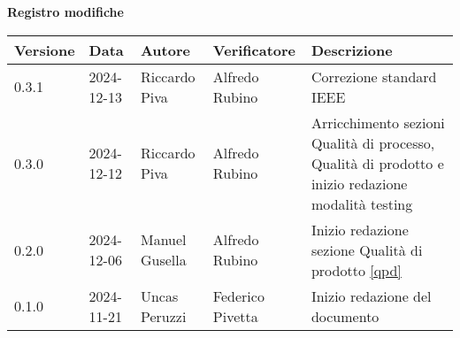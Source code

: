 \documentclass[11pt]{article}
\begin{document}
\begin{center}
\textbf{Registro modifiche}\\
\vspace{2mm}
\begin{tabularx}{\textwidth}{|l|l|l|l|X|}
\hline
\textbf{Versione} & \textbf{Data} & \textbf{Autore} & \textbf{Verificatore} & \textbf{Descrizione} \\
\hline
0.3.1 & 2024-12-13 & Riccardo Piva & Alfredo Rubino & Correzione standard IEEE \\
\hline
0.3.0 & 2024-12-12 & Riccardo Piva & Alfredo Rubino & Arricchimento sezioni Qualità di processo, Qualità di prodotto e inizio redazione modalità testing \\
\hline
0.2.0 & 2024-12-06 & Manuel Gusella  & Alfredo Rubino & Inizio redazione sezione Qualità di prodotto \ref{qpd}\\
\hline
0.1.0 & 2024-11-21 & Uncas Peruzzi  & Federico Pivetta & Inizio redazione del documento\\
\hline
\end{tabularx}
\end{center}
\newpage
\tableofcontents
\listoffigures %
\listoftables %
\newpage
\end{document}
